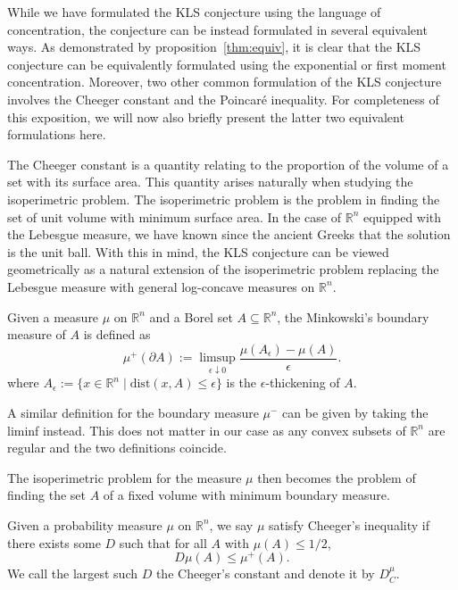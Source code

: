 While we have formulated the KLS conjecture using the language of concentration, the conjecture can be  
instead formulated in several equivalent ways. As demonstrated by proposition~\ref{thm:equiv}, it is clear 
that the KLS conjecture can be equivalently formulated using the exponential or first moment concentration. 
Moreover, two other common formulation of the KLS conjecture involves the Cheeger constant and the Poincaré 
inequality. For completeness of this exposition, we will now also briefly present the latter two equivalent 
formulations here. 

The Cheeger constant is a quantity relating to the proportion of the volume of a set with its surface area.
This quantity arises naturally when studying the isoperimetric problem. The isoperimetric problem is the problem 
in finding the set of unit volume with minimum surface area. In the case of \(\mathbb{R}^n\) equipped with the 
Lebesgue measure, we have known since the ancient Greeks that the solution is the unit ball. 
With this in mind, the KLS conjecture can be viewed geometrically as a natural extension of the isoperimetric problem 
replacing the Lebesgue measure with general log-concave measures on \(\mathbb{R}^n\).

\begin{definition}
  Given a measure \(\mu\) on \(\mathbb{R}^n\) and a Borel set \(A \subseteq \mathbb{R}^n\), the Minkowski's 
  boundary measure of \(A\) is defined as
  \[\mu^+(\partial A) := \limsup_{\epsilon \downarrow 0} \frac{\mu(A_\epsilon) - \mu(A)}{\epsilon}.\]
  where \(A_\epsilon := \{x \in \mathbb{R}^n \mid \text{dist}(x, A) \le \epsilon\}\) is the 
  \(\epsilon\)-thickening of \(A\). 

  A similar definition for the boundary measure \(\mu^-\) can be given by taking the liminf instead. This 
  does not matter in our case as any convex subsets of \(\mathbb{R}^n\) are regular and the two definitions 
  coincide. 
\end{definition}

The isoperimetric problem for the measure \(\mu\) then becomes the problem of finding the set \(A\) 
of a fixed volume with minimum boundary measure. 

\begin{definition}
  Given a probability measure \(\mu\) on \(\mathbb{R}^n\), we say \(\mu\) satisfy Cheeger's inequality 
  if there exists some \(D\) such that for all \(A\) with \(\mu(A) \le 1 / 2\),
  \[D\mu(A) \le \mu^+(A).\]
  We call the largest such \(D\) the Cheeger's constant and denote it by \(D^\mu_C\).
\end{definition}

